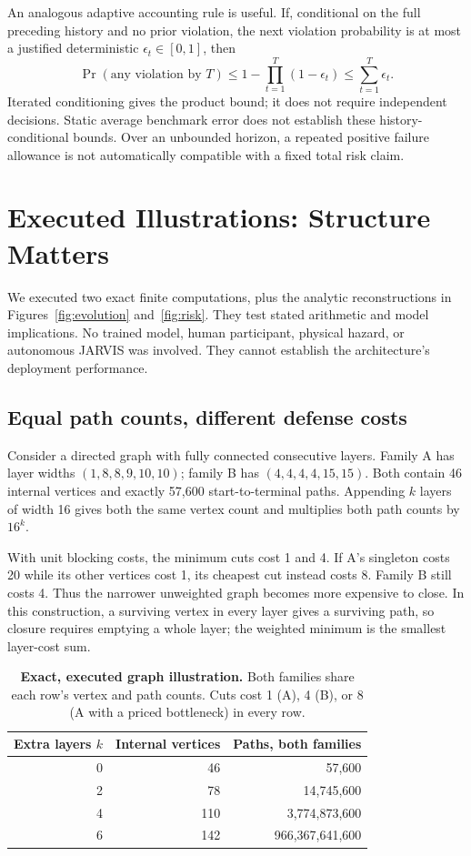 \documentclass[10pt,twocolumn,letterpaper]{article}
\begin{document}
An analogous adaptive accounting rule is useful. If, conditional on the full preceding history and no prior violation, the next violation probability is at most a justified deterministic $\epsilon_t\in[0,1]$, then
\begin{equation}
\Pr(\text{any violation by }T)\leq
1-\prod_{t=1}^{T}(1-\epsilon_t)\leq\sum_{t=1}^{T}\epsilon_t.
\label{eq:adaptive}
\end{equation}
Iterated conditioning gives the product bound; it does not require independent decisions. Static average benchmark error does not establish these history-conditional bounds. Over an unbounded horizon, a repeated positive failure allowance is not automatically compatible with a fixed total risk claim.

\section{Executed Illustrations: Structure Matters}
\label{sec:illustrations}
We executed two exact finite computations, plus the analytic reconstructions in Figures~\ref{fig:evolution} and~\ref{fig:risk}. They test stated arithmetic and model implications. No trained model, human participant, physical hazard, or autonomous JARVIS was involved. They cannot establish the architecture's deployment performance.

\subsection{Equal path counts, different defense costs}
Consider a directed graph with fully connected consecutive layers. Family A has layer widths $(1,8,8,9,10,10)$; family B has $(4,4,4,4,15,15)$. Both contain 46 internal vertices and exactly 57,600 start-to-terminal paths. Appending $k$ layers of width 16 gives both the same vertex count and multiplies both path counts by $16^k$.

With unit blocking costs, the minimum cuts cost 1 and 4. If A's singleton costs 20 while its other vertices cost 1, its cheapest cut instead costs 8. Family B still costs 4. Thus the narrower unweighted graph becomes more expensive to close. In this construction, a surviving vertex in every layer gives a surviving path, so closure requires emptying a whole layer; the weighted minimum is the smallest layer-cost sum.

\begin{table}[t]
\centering\small
\caption{\textbf{Exact, executed graph illustration.} Both families share each row's vertex and path counts. Cuts cost 1 (A), 4 (B), or 8 (A with a priced bottleneck) in every row.}
\label{tab:graphs}
\begin{tabular}{@{}rrr@{}}\toprule
\textbf{Extra layers $k$} & \textbf{Internal vertices} & \textbf{Paths, both families}\\\midrule
0 & 46 & 57,600\\
2 & 78 & 14,745,600\\
4 & 110 & 3,774,873,600\\
6 & 142 & 966,367,641,600\\
\bottomrule\end{tabular}
\end{table}
\end{document}
